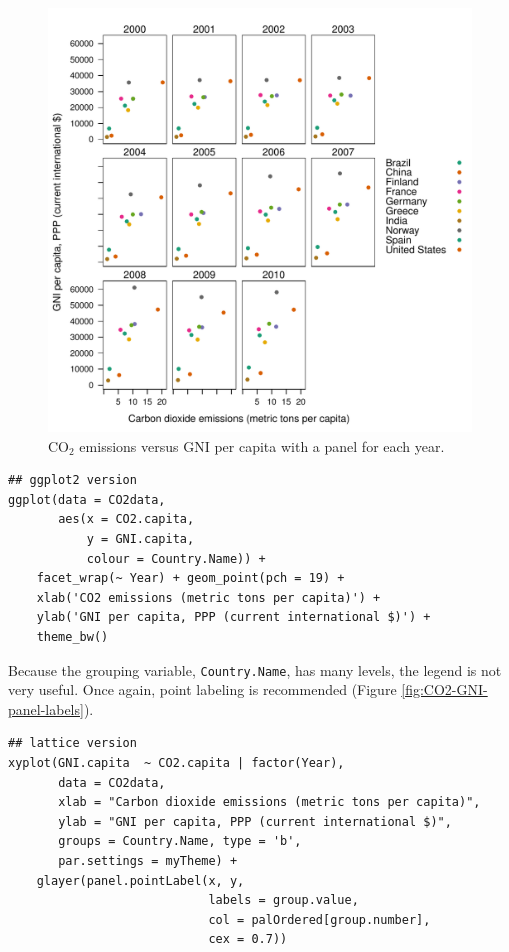 \begin{figure}[htbp]
\centering
\includegraphics[width=.9\linewidth]{figs/CO2_capita_panel.pdf}
\caption{\(\mathrm{CO_2}\) emissions versus GNI per capita with a panel for each year. \label{fig:CO2-GNI-panel}}
\end{figure}

\lstset{language=r,label= ,caption= ,captionpos=b,numbers=none}
\begin{lstlisting}
## ggplot2 version
ggplot(data = CO2data,
       aes(x = CO2.capita,
           y = GNI.capita,
           colour = Country.Name)) +
    facet_wrap(~ Year) + geom_point(pch = 19) + 
    xlab('CO2 emissions (metric tons per capita)') +
    ylab('GNI per capita, PPP (current international $)') +
    theme_bw()
\end{lstlisting}

Because the grouping variable, \texttt{Country.Name}, has many levels, the
legend is not very useful. Once again, point labeling is recommended
(Figure \ref{fig:CO2-GNI-panel-labels}).

\lstset{language=r,label= ,caption= ,captionpos=b,numbers=none}
\begin{lstlisting}
## lattice version
xyplot(GNI.capita  ~ CO2.capita | factor(Year),
       data = CO2data,
       xlab = "Carbon dioxide emissions (metric tons per capita)",
       ylab = "GNI per capita, PPP (current international $)",
       groups = Country.Name, type = 'b',
       par.settings = myTheme) + 
    glayer(panel.pointLabel(x, y,
                            labels = group.value,
                            col = palOrdered[group.number],
                            cex = 0.7))
\end{lstlisting}

